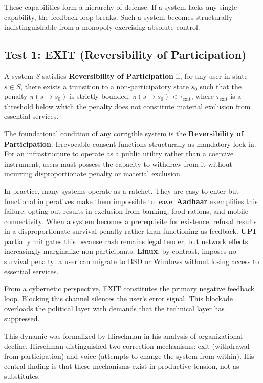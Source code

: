 These capabilities form a hierarchy of defense. If a system lacks any single capability, the feedback loop breaks. Such a system becomes structurally indistinguishable from a monopoly exercising absolute control.

\subsection{Test 1: EXIT (Reversibility of Participation)}

\begin{definition}[EXIT]
\label{def:exit}
A system $S$ satisfies \textbf{Reversibility of Participation} if, for any user in state $s \in S$, there exists a transition to a non-participatory state $s_0$ such that the penalty $\pi(s \to s_0)$ is strictly bounded: $\pi(s \to s_0) < \tau_{\text{exit}}$, where $\tau_{\text{exit}}$ is a threshold below which the penalty does not constitute material exclusion from essential services.
\end{definition}

The foundational condition of any corrigible system is the \textbf{Reversibility of Participation}. Irrevocable consent functions structurally as mandatory lock-in. For an infrastructure to operate as a public utility rather than a coercive instrument, users must possess the capacity to withdraw from it without incurring disproportionate penalty or material exclusion.

In practice, many systems operate as a ratchet. They are easy to enter but functional imperatives make them impossible to leave. \textbf{Aadhaar} exemplifies this failure: opting out results in exclusion from banking, food rations, and mobile connectivity. When a system becomes a prerequisite for existence, refusal results in a disproportionate survival penalty rather than functioning as feedback. \textbf{UPI} partially mitigates this because cash remains legal tender, but network effects increasingly marginalize non-participants. \textbf{Linux}, by contrast, imposes no survival penalty: a user can migrate to BSD or Windows without losing access to essential services.

From a cybernetic perspective, EXIT constitutes the primary negative feedback loop. Blocking this channel silences the user's error signal. This blockade overloads the political layer with demands that the technical layer has suppressed.

This dynamic was formalized by Hirschman \citep{hirschman1970} in his analysis of organizational decline. Hirschman distinguished two correction mechanisms: exit (withdrawal from participation) and voice (attempts to change the system from within). His central finding is that these mechanisms exist in productive tension, not as substitutes.

